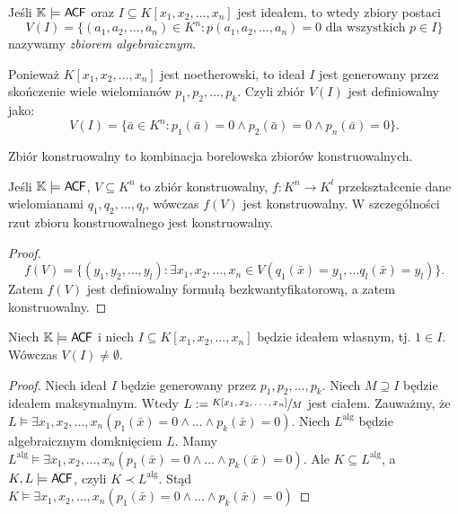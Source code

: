 \documentclass{article}
\begin{document}
\begin{df}
	Jeśli $\mathbb{K} \models \mathsf{A \mkern-2.0mu C \mkern-1.1mu F}$ oraz $I \subseteq K[x_1, x_2, \ldots, x_n ]$ jest ideałem, to wtedy zbiory postaci $$V(I) = \{(a_1, a_2, \ldots, a_n) \in K^n \colon p( a_1, a_2, \ldots, a_n ) = 0 \text{ dla wszystkich } p \in I\}$$ nazywamy \textit{zbiorem algebraicznym}.
\end{df}


\begin{obs}
	Ponieważ $K[x_1, x_2, \ldots, x_n ]$ jest noetherowski, to ideał $I$ jest generowany przez skończenie wiele wielomianów $p_1, p_2, \ldots, p_k$.
	Czyli zbiór $V(I)$ jest definiowalny jako:
	$$V(I) = \{ \bar{a} \in K^n \colon p_1(\bar{a}) = 0 \wedge p_2(\bar{a}) = 0 \wedge p_n(\bar{a})=0 \}.$$
\end{obs}

\begin{df}
	 Zbiór konstruowalny to kombinacja borelowska zbiorów konstruowalnych.
\end{df}

\begin{tw}[Chevalley'a]
	 Jeśli $\mathbb{K} \models \mathsf{A \mkern-2.0mu C \mkern-1.1mu F}$, $V \subseteq K^n$ to zbiór konstruowalny, $f \colon K^n \to K^l$ przekształcenie dane wielomianami $q_1, q_2, \ldots, q_l$,
	 wówczas $f(V)$ jest konstruowalny.
	 W szczególności rzut zbioru konstruowalnego jest konstruowalny.
\end{tw}
\begin{proof}
	\[
		f(V) = \{ (y_1, y_2, \ldots, y_l ) \colon \exists x_1, x_2, \ldots, x_n \in V (q_1(\bar{x}) = y_1, \ldots q_l(\bar{x}) = y_l)  \}.
	\]
	Zatem $ f(V) $ jest definiowalny formułą bezkwantyfikatorową, a zatem konstruowalny.
\end{proof}

\begin{tw}
	Niech $  \mathbb{K} \models \mathsf{A \mkern-2.0mu C \mkern-1.1mu F} $ i niech $  I \subseteq K[x_1, x_2, \ldots, x_n ] $ będzie ideałem własnym, tj. $  1 \in I $.
	Wówczas $  V(I) \neq \emptyset $.
\end{tw}
\begin{proof}
	 Niech ideał $I$ będzie generowany przez $  p_1, p_2, \ldots, p_k  $.
	 Niech $  M \supseteq I$ będzie ideałem maksymalnym.
	 Wtedy $L :=  \sfrac{K[x_1, x_2, \ldots, x_n ]}{M} $ jest ciałem.
	 Zauważmy, że $  L \models \exists x_1, x_2, \ldots, x_n (p_1(\bar{x}) = 0 \wedge \ldots \wedge p_k(\bar{x}) = 0) $.
	 Niech $ L^{\text{alg}} $ będzie algebraicznym domknięciem $ L $.
	Mamy $  L^{\text{alg}} \models \exists x_1, x_2, \ldots, x_n (p_1(\bar{x}) = 0 \wedge \ldots \wedge p_k(\bar{x}) = 0) $.
	Ale $  K \subseteq L^{\text{alg}} $, a $ K , L \models \mathsf{A \mkern-2.0mu C \mkern-1.1mu F} $, czyli $ K \prec L^{\text{alg}} $.
	Stąd $  K \models \exists x_1, x_2, \ldots, x_n (p_1(\bar{x}) = 0 \wedge \ldots \wedge p_k(\bar{x}) = 0) $
\end{proof}
\end{document}
